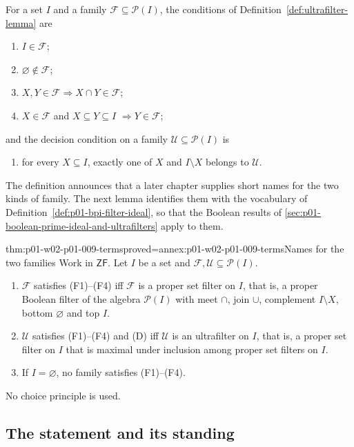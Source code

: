 For a set \(I\) and a family \(\mathcal F\subseteq\mathcal P(I)\), the
conditions of Definition~\ref{def:ultrafilter-lemma} are
\begin{enumerate}
  \item[(F1)] \(I\in\mathcal F\);
  \item[(F2)] \(\varnothing\notin\mathcal F\);
  \item[(F3)] \(X,Y\in\mathcal F\Rightarrow X\cap Y\in\mathcal F\);
  \item[(F4)] \(X\in\mathcal F\) and \(X\subseteq Y\subseteq I\)
    \(\Rightarrow Y\in\mathcal F\);
\end{enumerate}
and the decision condition on a family \(\mathcal U\subseteq\mathcal P(I)\) is
\begin{enumerate}
  \item[(D)] for every \(X\subseteq I\), exactly one of \(X\) and
    \(I\setminus X\) belongs to \(\mathcal U\).
\end{enumerate}
The definition announces that a later chapter supplies short names for the
two kinds of family. The next lemma identifies them with the vocabulary of
Definition~\ref{def:p01-bpi-filter-ideal}, so that the Boolean results of
\cref{sec:p01-boolean-prime-ideal-and-ultrafilters} apply to them.

\begin{hblemma}{thm:p01-w02-p01-009-terms}{proved=annex:p01-w02-p01-009-terms}{Names for the two families}
Work in \(\mathsf{ZF}\). Let \(I\) be a set and
\(\mathcal F,\mathcal U\subseteq\mathcal P(I)\).
\begin{enumerate}
  \item \(\mathcal F\) satisfies (F1)--(F4) iff \(\mathcal F\) is a proper
    set filter on \(I\), that is, a proper Boolean filter of the algebra
    \(\mathcal P(I)\) with meet \(\cap\), join \(\cup\), complement
    \(I\setminus X\), bottom \(\varnothing\) and top \(I\).
  \item \(\mathcal U\) satisfies (F1)--(F4) and (D) iff \(\mathcal U\) is an
    ultrafilter on \(I\), that is, a proper set filter on \(I\) that is
    maximal under inclusion among proper set filters on \(I\).
  \item If \(I=\varnothing\), no family satisfies (F1)--(F4).
\end{enumerate}
No choice principle is used.
\end{hblemma}

\subsection{The statement and its standing}
\label{sec:p01-w02-p01-009-statement}

